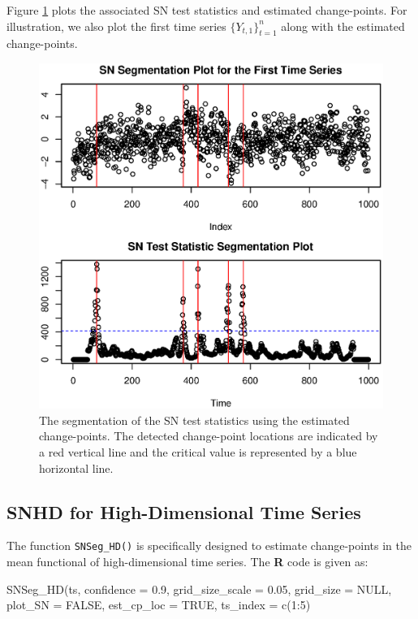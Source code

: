 Figure \ref{fig:SN-multi-mean} plots the associated SN test statistics and estimated change-points. For illustration, we also plot the first time series $\{Y_{t,1}\}_{t=1}^n$ along with the estimated change-points.

\begin{figure}[h]
	\centering
	\includegraphics[scale=0.5]{multi_mean.eps}
	\caption{The segmentation of the SN test statistics using the estimated change-points. The detected change-point locations are indicated by a red vertical line and the critical value is represented by a blue horizontal line.}
	\label{fig:SN-multi-mean}
\end{figure}


\subsection{SNHD for High-Dimensional Time Series}\label{subsec:SNSegHD}
The function \texttt{SNSeg\_HD()} is specifically designed to estimate change-points in the mean functional of  high-dimensional time series. The \textbf{R} code is given as:

\begin{example}
SNSeg_HD(ts, confidence = 0.9, grid_size_scale = 0.05, grid_size = NULL,
         plot_SN = FALSE, est_cp_loc = TRUE, ts_index = c(1:5)
\end{example}

